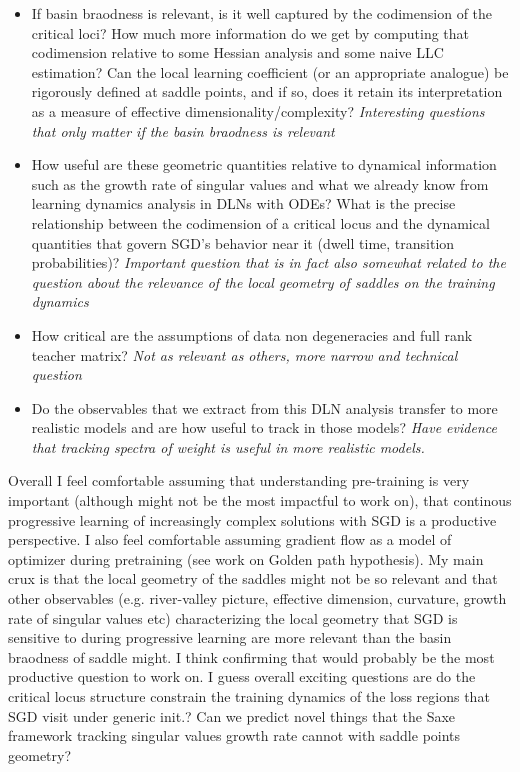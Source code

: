 \documentclass{article}
\theoremstyle{definition}
\begin{document}
\begin{itemize}
    \item If basin braodness is relevant, is it well captured by the codimension of the critical loci? How much more information do we get by computing that codimension relative to some Hessian analysis and some naive LLC estimation? Can the local learning coefficient (or an appropriate analogue) be rigorously defined at saddle points, and if so, does it retain its interpretation as a measure of effective dimensionality/complexity? \textit{Interesting questions that only matter if the basin braodness is relevant}
    \item How useful are these geometric quantities relative to dynamical information such as the growth rate of singular values and what we already know from learning dynamics analysis in DLNs with ODEs? What is the precise relationship between the codimension of a critical locus and the dynamical quantities that govern SGD's behavior near it (dwell time, transition probabilities)? \textit{Important question that is in fact also somewhat related to the question about the relevance of the local geometry of saddles on the training dynamics}
    \item How critical are the assumptions of data non degeneracies and full rank teacher matrix? \textit{Not as relevant as others, more narrow and technical question}
    \item Do the observables that we extract from this DLN analysis transfer to more realistic models and are how useful to track in those models? \textit{Have evidence that tracking spectra of weight is useful in more realistic models.}
\end{itemize}
Overall I feel comfortable assuming that understanding pre-training is very important (although might not be the most impactful to work on), that continous progressive learning of increasingly complex solutions with SGD is a productive perspective. I also feel comfortable assuming gradient flow as a model of optimizer during pretraining (see work on Golden path hypothesis). My main crux is that the local geometry of the saddles might not be so relevant and that other observables (e.g. river-valley picture, effective dimension, curvature, growth rate of singular values etc) characterizing the local geometry that SGD is sensitive to during progressive learning are more relevant than the basin braodness of saddle might. I think confirming that would probably be the most productive question to work on. I guess overall exciting questions are do the critical locus structure constrain the training dynamics of the loss regions that SGD visit under generic init.? Can we predict novel things that the Saxe framework tracking singular values growth rate cannot with saddle points geometry?
\end{document}
